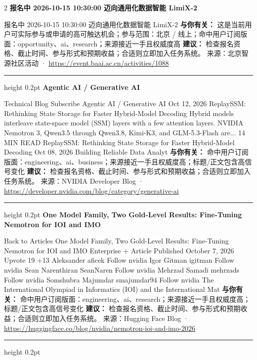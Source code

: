 \documentclass[10.5pt]{ctexart}
\begin{document}
\begin{multicols}{2}
{\large\bfseries 报名中 2026-10-15 10:30:00 迈向通用化数据智能 LimiX-2}\par
报名中 2026-10-15 10:30:00 迈向通用化数据智能 LimiX-2
\textbf{与你有关：} 这是当前用户可实际参与或申请的高可触达机会；参与范围：北京 / 线上；命中用户订阅版面：opportunity、ai、research；来源接近一手且权威度高
\textbf{建议：} 检查报名资格、截止时间、参与形式和预期收益；合适则立即加入任务系统。
{\footnotesize\color{ormuted} 来源：北京智源社区活动 · \url{https://event.baai.ac.cn/activities/1088}}
\vspace{2mm}
\hrule height 0.2pt
\vspace{2mm}
{\large\bfseries Agentic AI / Generative AI}\par
Technical Blog Subscribe Agentic AI / Generative AI Oct 12, 2026 ReplaySSM: Rethinking State Storage for Faster Hybrid-Model Decoding Hybrid models interleave state-space model (SSM) layers with a few attention layers. NVIDIA Nemotron 3, Qwen3.5 through Qwen3.8, Kimi-K3, and GLM-5.3-Flash are... 14 MIN READ ReplaySSM: Rethinking State Storage for Faster Hybrid-Model Decoding Oct 08, 2026 Building Reliable Data Analyt
\textbf{与你有关：} 命中用户订阅版面：engineering、ai、business；来源接近一手且权威度高；标题/正文包含高信号变化
\textbf{建议：} 检查报名资格、截止时间、参与形式和预期收益；合适则立即加入任务系统。
{\footnotesize\color{ormuted} 来源：NVIDIA Developer Blog · \url{https://developer.nvidia.com/blog/category/generative-ai}}
\vspace{2mm}
\hrule height 0.2pt
\vspace{2mm}
{\large\bfseries One Model Family, Two Gold-Level Results: Fine-Tuning Nemotron for IOI and IMO}\par
Back to Articles One Model Family, Two Gold-Level Results: Fine-Tuning Nemotron for IOI and IMO Enterprise + Article Published October 7, 2026 Upvote 19 +13 Aleksander aficek Follow nvidia Igor Gitman igitman Follow nvidia Sean Narenthiran SeanNaren Follow nvidia Mehrzad Samadi mehrzads Follow nvidia Somshubra Majumdar smajumdar94 Follow nvidia The International Olympiad in Informatics (IOI) and the International Mat
\textbf{与你有关：} 命中用户订阅版面：engineering、ai、research；来源接近一手且权威度高；标题/正文包含高信号变化
\textbf{建议：} 检查报名资格、截止时间、参与形式和预期收益；合适则立即加入任务系统。
{\footnotesize\color{ormuted} 来源：Hugging Face Blog · \url{https://huggingface.co/blog/nvidia/nemotron-ioi-and-imo-2026}}
\vspace{2mm}
\hrule height 0.2pt

\end{multicols}
\end{document}
